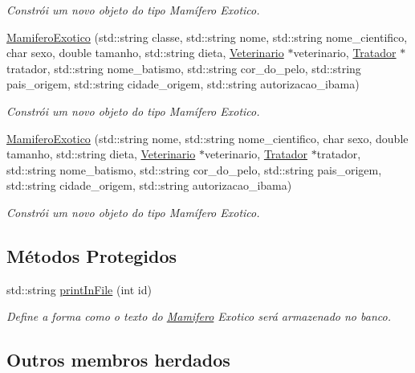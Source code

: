 \begin{DoxyCompactItemize}
\begin{DoxyCompactList}\small\item\em Constrói um novo objeto do tipo Mamífero Exotico. \end{DoxyCompactList}\item 
\hyperlink{classMamiferoExotico_a8a37f494ace0c42dfd8fabe5c1f93261}{Mamifero\+Exotico} (std\+::string classe, std\+::string nome, std\+::string nome\+\_\+cientifico, char sexo, double tamanho, std\+::string dieta, \hyperlink{classVeterinario}{Veterinario} $\ast$veterinario, \hyperlink{classTratador}{Tratador} $\ast$tratador, std\+::string nome\+\_\+batismo, std\+::string cor\+\_\+do\+\_\+pelo, std\+::string pais\+\_\+origem, std\+::string cidade\+\_\+origem, std\+::string autorizacao\+\_\+ibama)
\begin{DoxyCompactList}\small\item\em Constrói um novo objeto do tipo Mamífero Exotico. \end{DoxyCompactList}\item 
\hyperlink{classMamiferoExotico_a02bae9875424a81c397082e378eb2168}{Mamifero\+Exotico} (std\+::string nome, std\+::string nome\+\_\+cientifico, char sexo, double tamanho, std\+::string dieta, \hyperlink{classVeterinario}{Veterinario} $\ast$veterinario, \hyperlink{classTratador}{Tratador} $\ast$tratador, std\+::string nome\+\_\+batismo, std\+::string cor\+\_\+do\+\_\+pelo, std\+::string pais\+\_\+origem, std\+::string cidade\+\_\+origem, std\+::string autorizacao\+\_\+ibama)
\begin{DoxyCompactList}\small\item\em Constrói um novo objeto do tipo Mamífero Exotico. \end{DoxyCompactList}\end{DoxyCompactItemize}
\subsection*{Métodos Protegidos}
\begin{DoxyCompactItemize}
\item 
std\+::string \hyperlink{classMamiferoExotico_a4ee6f5f4a2917cfdf54304525add0c4a}{print\+In\+File} (int id)
\begin{DoxyCompactList}\small\item\em Define a forma como o texto do \hyperlink{classMamifero}{Mamifero} Exotico será armazenado no banco. \end{DoxyCompactList}\end{DoxyCompactItemize}
\subsection*{Outros membros herdados}


